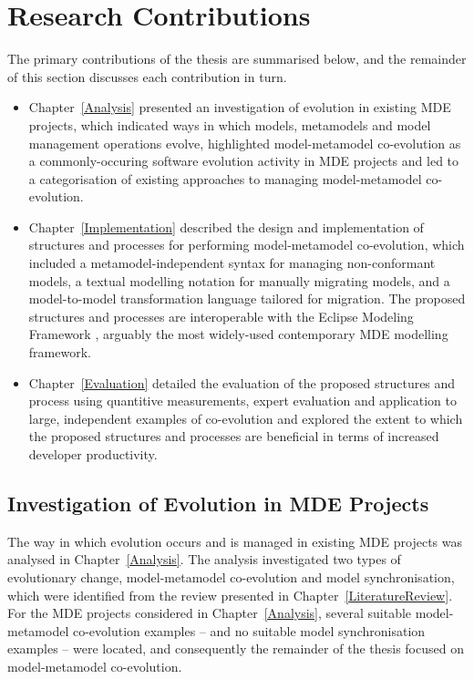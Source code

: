 
\section{Research Contributions}
The primary contributions of the thesis are summarised below, and the remainder of this section discusses each contribution in turn.

\begin{itemize}
	\item Chapter~\ref{Analysis} presented an investigation of evolution in existing MDE projects, which indicated ways in which models, metamodels and model management operations evolve, highlighted model-metamodel co-evolution as a commonly-occuring software evolution activity in MDE projects and led to a categorisation of existing approaches to managing model-metamodel co-evolution.
	\item Chapter~\ref{Implementation} described the design and implementation of structures and processes for performing model-metamodel co-evolution, which included a metamodel-independent syntax for managing non-conformant models, a textual modelling notation for manually migrating models, and a model-to-model transformation language tailored for migration. The proposed structures and processes are interoperable with the Eclipse Modeling Framework \cite{steinberg09emf}, arguably the most widely-used contemporary MDE modelling framework.
	\item Chapter~\ref{Evaluation} detailed the evaluation of the proposed structures and process using quantitive measurements, expert evaluation and application to large, independent examples of co-evolution and explored the extent to which the proposed structures and processes are beneficial in terms of increased developer productivity.
\end{itemize}


\subsection{Investigation of Evolution in MDE Projects}
The way in which evolution occurs and is managed in existing MDE projects was analysed in Chapter~\ref{Analysis}. The analysis investigated two types of evolutionary change, model-metamodel co-evolution and model synchronisation, which were identified from the review presented in Chapter~\ref{LiteratureReview}. For the MDE projects considered in Chapter~\ref{Analysis}, several suitable model-metamodel co-evolution examples -- and no suitable model synchronisation examples -- were located, and consequently the remainder of the thesis focused on model-metamodel co-evolution.

